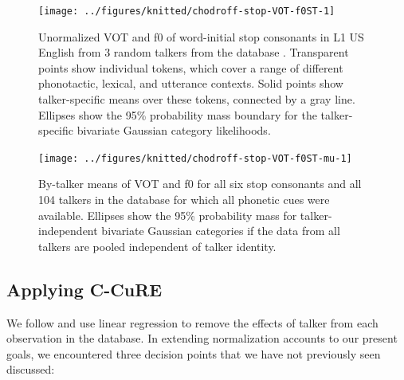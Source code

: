 \documentclass[
  11pt,
  man,floatsintext]{apa6}
\begin{document}
\begin{figure}

{\centering \texttt{[image: ../figures/knitted/chodroff-stop-VOT-f0ST-1]} 

}

\caption{Unormalized VOT and f0 of word-initial stop consonants in L1 US English from 3 random talkers from the database \autocite{chodroff-wilson2018}. Transparent points show individual tokens, which cover a range of different phonotactic, lexical, and utterance contexts. Solid points show talker-specific means over these tokens, connected by a gray line. Ellipses show the 95\% probability mass boundary for the talker-specific bivariate Gaussian category likelihoods.}\label{fig:chodroff-stop-VOT-f0ST}
\end{figure}



\begin{figure}

{\centering \texttt{[image: ../figures/knitted/chodroff-stop-VOT-f0ST-mu-1]} 

}

\caption{By-talker means of VOT and f0 for all six stop consonants and all 104 talkers in the database \autocite{chodroff-wilson2018} for which all phonetic cues were available. Ellipses show the 95\% probability mass for talker-independent bivariate Gaussian categories if the data from all talkers are pooled independent of talker identity.}\label{fig:chodroff-stop-VOT-f0ST-mu}
\end{figure}

\hypertarget{sec:SI-applying-C-CuRE}{%
\subsection{Applying C-CuRE}\label{sec:SI-applying-C-CuRE}}

We follow \textcite{mcmurray-jongman2011} and use linear regression to remove the effects of talker from each observation in the database. In extending normalization accounts to our present goals, we encountered three decision points that we have not previously seen discussed:
\end{document}
